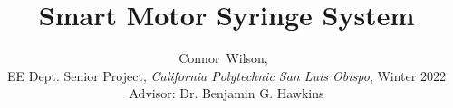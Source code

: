 \documentclass[journal]{IEEEtran}
\begin{document}
\graphicspath{ {./Images/} }
%
\title{Smart Motor Syringe System}
%
%
%

\author{Connor~Wilson,~ \\
        \small{EE Dept. Senior Project, \emph{California Polytechnic San Luis Obispo}, Winter 2022\\
        Advisor: Dr. Benjamin G. Hawkins}
}

% 
%
\end{document}
